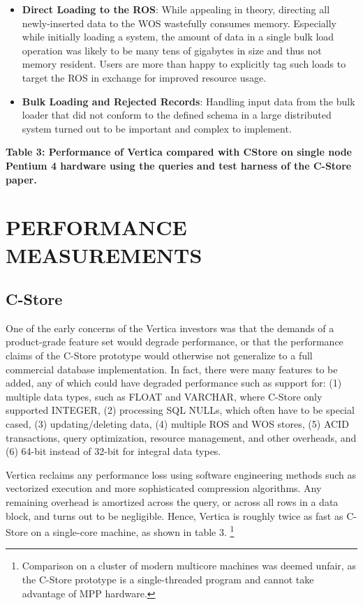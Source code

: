 \documentclass[a4paper,12pt,notitlepage,twoside,openright]{article}
\begin{document}
\begin{itemize}
\item
  \textbf{Direct Loading to the ROS}: While appealing in theory,
  directing all newly-inserted data to the WOS wastefully consumes
  memory. Especially while initially loading a system, the amount of
  data in a single bulk load operation was likely to be many tens of
  gigabytes in size and thus not memory resident. Users are more than
  happy to explicitly tag such loads to target the ROS in exchange for
  improved resource usage.
\item

  \textbf{Bulk Loading and Rejected Records}: Handling input data from
  the bulk loader that did not conform to the defined schema in a large
  distributed system turned out to be important and complex to
  implement.

\end{itemize}

\textbf{Table 3: Performance of Vertica compared with CStore on single
node Pentium 4 hardware using the queries and test harness of the
C-Store paper.}

\hypertarget{performance-measurements}{%
\section{PERFORMANCE MEASUREMENTS}\label{performance-measurements}}

\hypertarget{c-store}{%
\subsection{C-Store}\label{c-store}}

One of the early concerns of the Vertica investors was that the demands
of a product-grade feature set would degrade performance, or that the
performance claims of the C-Store prototype would otherwise not
generalize to a full commercial database implementation. In fact, there
were many features to be added, any of which could have degraded
performance such as support for: (1) multiple data types, such as FLOAT
and VARCHAR, where C-Store only supported INTEGER, (2) processing SQL
NULLs, which often have to be special cased, (3) updating/deleting data,
(4) multiple ROS and WOS stores, (5) ACID transactions, query
optimization, resource management, and other overheads, and (6) 64-bit
instead of 32-bit for integral data types.

Vertica reclaims any performance loss using software engineering methods
such as vectorized execution and more sophisticated compression
algorithms. Any remaining overhead is amortized across the query, or
across all rows in a data block, and turns out to be negligible. Hence,
Vertica is roughly twice as fast as C-Store on a single-core machine, as
shown in table 3. \footnote{Comparison on a cluster of modern multicore
  machines was deemed unfair, as the C-Store prototype is a
  single-threaded program and cannot take advantage of MPP hardware.}
\end{document}
